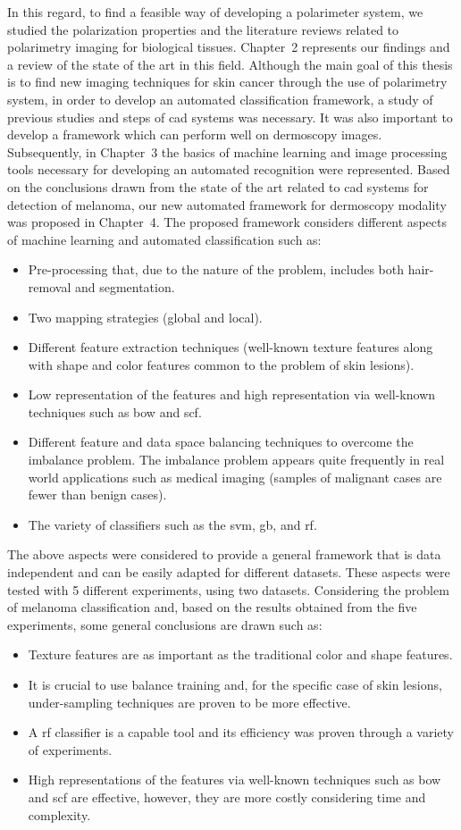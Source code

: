 In this regard, to find a feasible way of developing a polarimeter system, we studied the polarization properties and the literature reviews related to polarimetry imaging for biological tissues.
Chapter~2 represents our findings and a review of the state of the art in this field.
Although the main goal of this thesis is to find new imaging techniques for skin cancer through the use of polarimetry system, in order to develop an automated classification framework, a study of previous studies and steps of \ac{cad} systems was necessary.
It was also important to develop a framework which can perform well on dermoscopy images. 
Subsequently, in Chapter~3 the basics of machine learning and image processing tools necessary for developing an automated recognition were represented.
Based on the conclusions drawn from the state of the art related to \ac{cad} systems for detection of melanoma, our new automated framework for dermoscopy modality was proposed in Chapter~4.
The proposed framework considers different aspects of machine learning and automated classification such as: 
\begin{itemize}
\item Pre-processing that, due to the nature of the problem, includes both hair-removal and segmentation.
\item Two mapping strategies (global and local).
\item Different feature extraction techniques (well-known texture features along with shape and color features common to the problem of skin lesions).
\item Low representation of the features and high representation via well-known techniques such as \ac{bow} and \ac{scf}. 
\item Different feature and data space balancing techniques to overcome the imbalance problem.
The imbalance problem appears quite frequently in real world applications such as medical imaging (samples of malignant cases are fewer than benign cases).
\item The variety of classifiers such as the \ac{svm}, \ac{gb}, and \ac{rf}. 
\end{itemize}
The above aspects were considered to provide a general framework that is data independent and can be easily adapted for different datasets.
These aspects were tested with 5 different experiments, using two datasets.
Considering the problem of melanoma classification and, based on the results obtained from the five experiments, some general conclusions are drawn such as: 
\begin{itemize}
\item Texture features are as important as the traditional color and shape features.
\item It is crucial to use balance training and, for the specific case of skin lesions, under-sampling techniques are proven to be more effective.
\item A \acl{rf} classifier is a capable tool and its efficiency was proven through a variety of experiments.
\item High representations of the features via well-known techniques such as \ac{bow} and \ac{scf} are effective, however, they are more costly considering time and complexity. 
\end{itemize}

